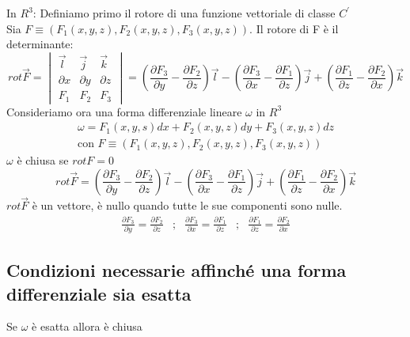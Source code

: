 \documentclass{book}
\begin{document}
\begin{center}
	\fbox
	{
		\begin{minipage}{0.85\textwidth}
			In $R^3$: Definiamo primo il rotore di una funzione vettoriale di 
			classe $C^\prime$ \\
			Sia $F\equiv (F_1(x,y,z),F_2(x,y,z),F_3(x,y,z))$. Il rotore di F è 
			il determinante:
			\begin{equation*}
				rot \vec{F}=\begin{vmatrix}
					\vec{l} &\vec{j} &\vec{k} \\
					\partial x & \partial y & \partial z\\
					F_1 & F_2 & F_3
				\end{vmatrix}=\left(\frac{\partial F_3}{\partial y}-
			\frac{\partial F_2}{\partial z}\right)\vec{l} -
				\left(\frac{\partial F_3}{\partial x}-
			\frac{\partial F_1}{\partial z}\right)\vec{j} +
				\left(\frac{\partial F_1}{\partial z}-
				\frac{\partial F_2}{\partial x}\right)\vec{k}
			\end{equation*}
			Consideriamo ora una forma differenziale lineare $\omega$ in $R^3$
			\begin{eqnarray*}
				\omega =F_1(x,y,s)dx+F_2(x,y,z)dy+F_3(x,y,z)dz\\
				\text{con } F\equiv(F_1(x,y,z),F_2(x,y,z), F_3(x,y,z))
			\end{eqnarray*}
			$\omega$ è chiusa se $rot F=0$
			\begin{equation*}
				rot\vec{F}=\left(\frac{\partial F_3}{\partial y}-
			\frac{\partial F_2}{\partial z}\right)\vec{l} -
				\left(\frac{\partial F_3}{\partial x}-
			\frac{\partial F_1}{\partial z}\right)\vec{j} +
				\left(\frac{\partial F_1}{\partial z}-
				\frac{\partial F_2}{\partial x}\right)\vec{k}
			\end{equation*}
			$rot \vec{F}$ è un vettore, è nullo quando tutte le sue componenti
			sono nulle.
			\begin{equation*}
				\begin{matrix}
				\frac{\partial F_3}{\partial y}=\frac{\partial F_2}{\partial z}
				& ; & \frac{\partial F_3}{\partial x}=\frac{\partial
				F_1}{\partial z} & ; &\frac{\partial F_1}{\partial z}=
				\frac{\partial F_2}{\partial x}
				\end{matrix}
			\end{equation*}
		\end{minipage}
	}
\end{center}
\clearpage
\subsection{Condizioni necessarie affinché una forma differenziale sia esatta}
Se $\omega$ è esatta allora è chiusa
\end{document}
